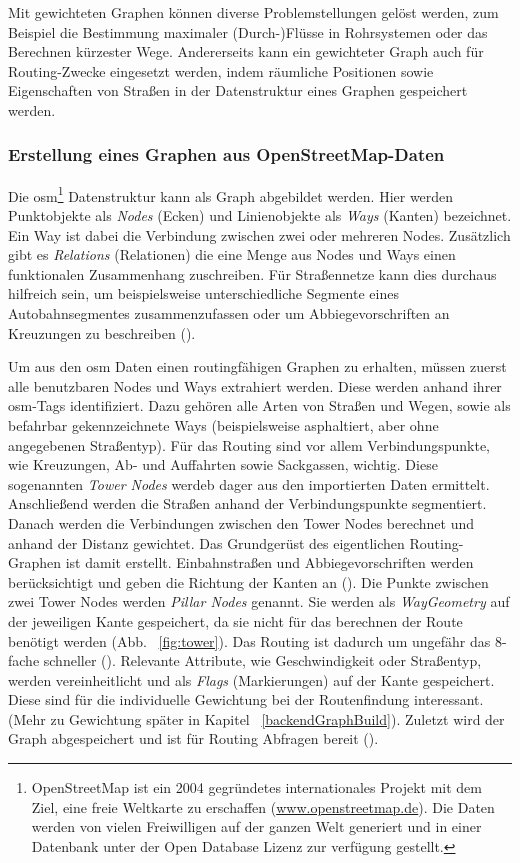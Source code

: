 Mit gewichteten Graphen können diverse Problemstellungen gelöst werden, zum Beispiel die Bestimmung maximaler (Durch-)Flüsse in Rohrsystemen oder das Berechnen kürzester Wege.
Andererseits kann ein gewichteter Graph auch für Routing-Zwecke eingesetzt werden, indem räumliche Positionen sowie Eigenschaften von Straßen in der Datenstruktur eines Graphen gespeichert werden.

\subsubsection{Erstellung eines Graphen aus OpenStreetMap-Daten}
\label{sec:osmgraph}

Die \gls{osm}\footnote{OpenStreetMap ist ein 2004 gegründetes internationales Projekt mit dem Ziel, eine freie Weltkarte zu erschaffen (\href{www.openstreetmap.de}{www.openstreetmap.de}). Die Daten werden von vielen Freiwilligen auf der ganzen Welt generiert und in einer Datenbank unter der Open Database Lizenz zur verfügung gestellt.} Datenstruktur kann als Graph abgebildet werden.
Hier werden Punktobjekte als \textit{Nodes} (Ecken) und Linienobjekte als \textit{Ways} (Kanten) bezeichnet.
Ein Way ist dabei die Verbindung zwischen zwei oder mehreren Nodes.
Zusätzlich gibt es \textit{Relations} (Relationen) die eine Menge aus Nodes und Ways einen funktionalen Zusammenhang zuschreiben.
Für Straßennetze kann dies durchaus hilfreich sein, um beispielsweise unterschiedliche Segmente eines Autobahnsegmentes zusammenzufassen oder um Abbiegevorschriften an Kreuzungen zu beschreiben (\cite{osmrelation}).

Um aus den \gls{osm} Daten einen routingfähigen Graphen zu erhalten, müssen zuerst alle benutzbaren Nodes und Ways extrahiert werden.
Diese werden anhand ihrer \gls{osm}-Tags identifiziert.
Dazu gehören alle Arten von Straßen und Wegen, sowie als befahrbar gekennzeichnete Ways (beispielsweise asphaltiert, aber ohne angegebenen Straßentyp).
Für das Routing sind vor allem Verbindungspunkte, wie Kreuzungen, Ab- und Auffahrten sowie Sackgassen, wichtig.
Diese sogenannten \textit{Tower Nodes} werdeb dager aus den importierten Daten ermittelt.
Anschließend werden die Straßen anhand der Verbindungspunkte segmentiert.
Danach werden die Verbindungen zwischen den Tower Nodes berechnet und anhand der Distanz gewichtet.
Das Grundgerüst des eigentlichen Routing-Graphen ist damit erstellt.
Einbahnstraßen und Abbiegevorschriften werden berücksichtigt und geben die Richtung der Kanten an (\cite{osmgraph}).
Die Punkte zwischen zwei Tower Nodes werden \textit{Pillar Nodes} genannt.
Sie werden als \textit{WayGeometry} auf der jeweiligen Kante gespeichert, da sie nicht für das berechnen der Route benötigt werden (Abb. ~\ref{fig:tower}).
Das Routing ist dadurch um ungefähr das 8-fache schneller (\cite{graphhopper}).
Relevante Attribute, wie Geschwindigkeit oder Straßentyp, werden vereinheitlicht und als \textit{Flags} (Markierungen) auf der Kante gespeichert.
Diese sind für die individuelle Gewichtung bei der Routenfindung interessant.
(Mehr zu Gewichtung später in Kapitel ~\ref{backendGraphBuild}).
Zuletzt wird der Graph abgespeichert und ist für Routing Abfragen bereit (\cite{osmgraph}).

